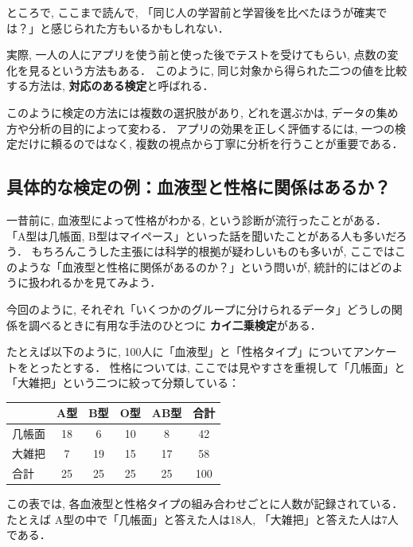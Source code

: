     ところで, ここまで読んで,
    「同じ人の学習前と学習後を比べたほうが確実では？」と感じられた方もいるかもしれない．
    
    実際, 一人の人にアプリを使う前と使った後でテストを受けてもらい,
    点数の変化を見るという方法もある．
    このように, 同じ対象から得られた二つの値を比較する方法は,
    \textbf{対応のある検定}と呼ばれる．
    
    このように検定の方法には複数の選択肢があり,
    どれを選ぶかは, データの集め方や分析の目的によって変わる．
    アプリの効果を正しく評価するには,
    一つの検定だけに頼るのではなく,
    複数の視点から丁寧に分析を行うことが重要である．


  \subsection{具体的な検定の例：血液型と性格に関係はあるか？}

    一昔前に, 血液型によって性格がわかる, という診断が流行ったことがある．  
    「A型は几帳面, B型はマイペース」といった話を聞いたことがある人も多いだろう．  
    もちろんこうした主張には科学的根拠が疑わしいものも多いが,  
    ここではこのような「血液型と性格に関係があるのか？」という問いが,  
    統計的にはどのように扱われるかを見てみよう．
    
    今回のように, それぞれ「いくつかのグループに分けられるデータ」どうしの関係を調べるときに有用な手法のひとつに
    \textbf{カイ二乗検定}がある．
    
    たとえば以下のように, 100人に「血液型」と「性格タイプ」についてアンケートをとったとする．  
    性格については, ここでは見やすさを重視して「几帳面」と「大雑把」という二つに絞って分類している：
    
    \begin{center}
      \begin{tabular}{l|cccc|c}
             & A型 & B型 & O型 & AB型 & 合計 \\
      \hline
      几帳面 & 18  & 6   & 10  & 8    & 42 \\
      大雑把 & 7   & 19  & 15  & 17   & 58 \\
      \hline
      合計   & 25  & 25  & 25  & 25   & 100
      \end{tabular}
    \end{center}
    
    この表では, 各血液型と性格タイプの組み合わせごとに人数が記録されている．  
    たとえば A型の中で「几帳面」と答えた人は18人, 「大雑把」と答えた人は7人である．
    
